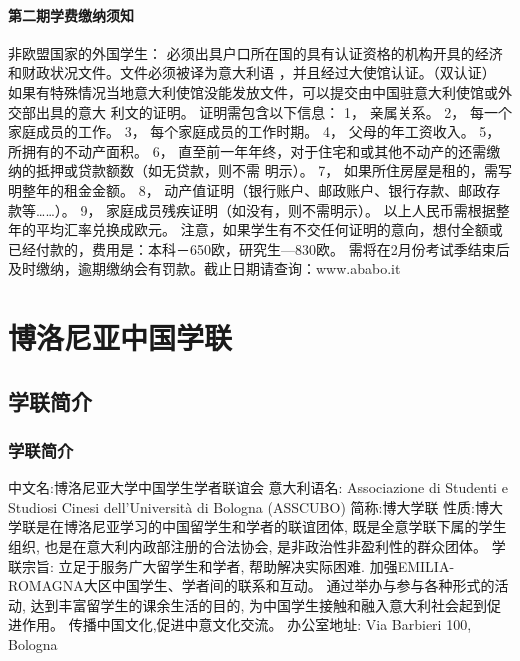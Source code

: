 \documentclass[3pt,a5paper,openright,twoside]{book}
\begin{document}
\subsubsection{第二期学费缴纳须知}
非欧盟国家的外国学生： 必须出具户口所在国的具有认证资格的机构开具的经济和财政状况文件。文件必须被译为意大利语 ，并且经过大使馆认证。（双认证） 如果有特殊情况当地意大利使馆没能发放文件，可以提交由中国驻意大利使馆或外交部出具的意大 利文的证明。 证明需包含以下信息： 1， 亲属关系。 2， 每一个家庭成员的工作。 3， 每个家庭成员的工作时期。 4， 父母的年工资收入。 5， 所拥有的不动产面积。 6， 直至前一年年终，对于住宅和或其他不动产的还需缴纳的抵押或贷款额数（如无贷款，则不需 明示）。 7， 如果所住房屋是租的，需写明整年的租金金额。 8， 动产值证明（银行账户、邮政账户、银行存款、邮政存款等……）。 9， 家庭成员残疾证明（如没有，则不需明示）。 以上人民币需根据整年的平均汇率兑换成欧元。 注意，如果学生有不交任何证明的意向，想付全额或已经付款的，费用是：本科－650欧，研究生—830欧。 需将在2月份考试季结束后及时缴纳，逾期缴纳会有罚款。截止日期请查询：www.ababo.it




% 
%
%
%

\chapter{博洛尼亚中国学联}              

\section{学联简介}

\subsection{学联简介}
中文名:博洛尼亚大学中国学生学者联谊会 
意大利语名: Associazione di Studenti e Studiosi Cinesi dell'Università di Bologna (ASSCUBO)
简称:博大学联
性质:博大学联是在博洛尼亚学习的中国留学生和学者的联谊团体, 既是全意学联下属的学生组织, 也是在意大利内政部注册的合法协会, 是非政治性非盈利性的群众团体。 
学联宗旨: 立足于服务广大留学生和学者, 帮助解决实际困难. 
加强EMILIA-ROMAGNA大区中国学生、学者间的联系和互动。 
通过举办与参与各种形式的活动, 达到丰富留学生的课余生活的目的, 为中国学生接触和融入意大利社会起到促进作用。 
 传播中国文化,促进中意文化交流。
办公室地址: Via Barbieri 100, Bologna
\end{document}
